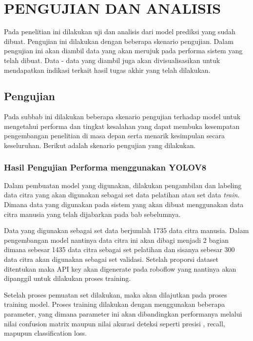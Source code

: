 \chapter{PENGUJIAN DAN ANALISIS}
\label{chap:pengujiananalisis}


Pada penelitian ini dilakukan uji dan analisis dari model prediksi yang sudah dibuat. Pengujian ini dilakukan dengan beberapa skenario pengujian. Dalam pengujian ini akan diambil data yang akan merujuk pada performa sistem yang telah dibuat. Data - data yang diambil juga akan divisualisasikan untuk mendapatkan indikasi terkait hasil tugas akhir yang telah dilakukan.

\section{Pengujian}
\label{sec:skenariopengujian}

Pada subbab ini dilakukan beberapa skenario pengujian terhadap model untuk mengetahui performa dan tingkat kesalahan yang dapat membuka kesempatan pengembangan penelitian di masa depan serta menarik kesimpulan secara keseluruhan. Berikut adalah skenario pengujian yang dilakukan.

\subsection{Hasil Pengujian Performa menggunakan YOLOV8}
Dalam pembuatan model yang digunakan, dilakukan pengambilan dan labeling data citra yang akan digunakan sebagai set data pelatihan atau set data \emph{train}. Dimana data yang digunakan pada sistem yang akan dibuat menggunakan data citra manusia yang telah dijabarkan pada bab sebelumnya.

Data yang digunakan sebagai set data berjumlah  1735 data citra manusia. Dalam pengembangan model nantinya data citra ini akan dibagi menjadi 2 bagian dimana sebesar 1435 data citra sebagai set pelatihan dan sisanya sebesar 300 data citra akan digunakan sebagai set validasi. Setelah proporsi dataset ditentukan maka API key akan digenerate pada roboflow yang nantinya akan dipanggil untuk dilakukan proses training. 

Setelah proses pemuatan set dilakukan, maka akan dilajutkan pada proses training model. Proses training dilakukan dengan menggunakan beberapa parameter, yang dimana parameter ini akan dibandingkan performanya melalui nilai confusion matrix maupun nilai akurasi deteksi seperti presisi , recall, mapupun classification loss.


